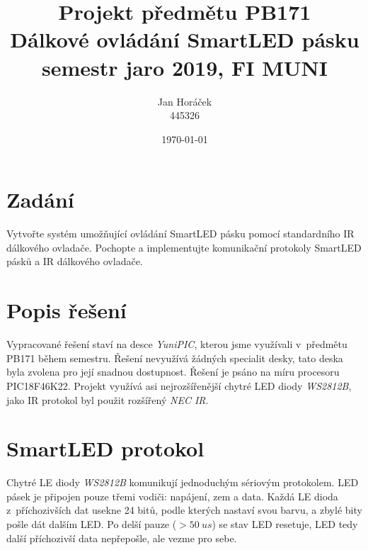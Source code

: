 \documentclass[12pt,a4paper]{article}
\begin{document}
\setcounter{page}{1}  %

\title{\normalsize Projekt předmětu PB171 \\ \huge Dálkové ovládání SmartLED pásku
\\ \normalsize semestr jaro 2019, FI MUNI}
\author{Jan Horáček\\ 445326}
\date{\today}
\maketitle

\setlength{\parindent}{0cm}
\setlength{\parskip}{3mm plus2pt minus2pt}

\section{Zadání}

Vytvořte systém umožňující ovládání SmartLED pásku pomocí standardního IR
dálkového ovladače. Pochopte a implementujte komunikační protokoly SmartLED
pásků a IR dálkového ovladače.

\section{Popis řešení}

Vypracované řešení staví na desce \textit{YuniPIC}, kterou jsme využívali
v~předmětu PB171 během semestru. Řešení nevyužívá žádných specialit desky,
tato deska byla zvolena pro její snadnou dostupnost. Řešení je psáno na míru
procesoru PIC18F46K22. Projekt využívá asi nejrozšířenější chytré LED diody
\textit{WS2812B}, jako IR protokol byl použit rozšířený \textit{NEC IR}.

\section{SmartLED protokol}

Chytré LE diody \textit{WS2812B} komunikují jednoduchým sériovým protokolem.
LED pásek je připojen pouze třemi vodiči: napájení, zem a data. Každá LE dioda
z~příchozivších dat usekne 24 bitů, podle kterých nastaví svou barvu, a zbylé
bity pošle dát dalším LED. Po delší pauze ($> 50\ us$) se stav LED resetuje,
LED tedy další příchozivší data nepřepošle, ale vezme pro sebe.
\end{document}
